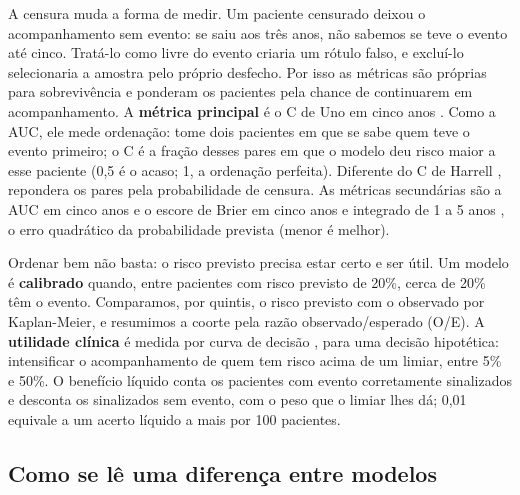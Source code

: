 \documentclass[12pt]{article}
\begin{document}
A censura muda a forma de medir. Um paciente censurado deixou o acompanhamento sem evento: se saiu aos três anos, não sabemos se teve o evento até cinco. Tratá-lo como livre do evento criaria um rótulo falso, e excluí-lo selecionaria a amostra pelo próprio desfecho. Por isso as métricas são próprias para sobrevivência e ponderam os pacientes pela chance de continuarem em acompanhamento. A \textbf{métrica principal} é o C de Uno em cinco anos \cite{uno2011cstat}. Como a AUC, ele mede ordenação: tome dois pacientes em que se sabe quem teve o evento primeiro; o C é a fração desses pares em que o modelo deu risco maior a esse paciente (0,5 é o acaso; 1, a ordenação perfeita). Diferente do C de Harrell \cite{harrell1982yield}, repondera os pares pela probabilidade de censura. As métricas secundárias são a AUC em cinco anos \cite{uno2007auc} e o escore de Brier em cinco anos e integrado de 1 a 5 anos \cite{graf1999brier}, o erro quadrático da probabilidade prevista (menor é melhor).

Ordenar bem não basta: o risco previsto precisa estar certo e ser útil. Um modelo é \textbf{calibrado} quando, entre pacientes com risco previsto de 20\%, cerca de 20\% têm o evento. Comparamos, por quintis, o risco previsto com o observado por Kaplan-Meier, e resumimos a coorte pela razão observado/esperado (O/E). A \textbf{utilidade clínica} é medida por curva de decisão \cite{vickers2008extensions}, para uma decisão hipotética: intensificar o acompanhamento de quem tem risco acima de um limiar, entre 5\% e 50\%. O benefício líquido conta os pacientes com evento corretamente sinalizados e desconta os sinalizados sem evento, com o peso que o limiar lhes dá; 0,01 equivale a um acerto líquido a mais por 100 pacientes.

\subsection{Como se lê uma diferença entre modelos}\label{subsec:incremental}
\end{document}
